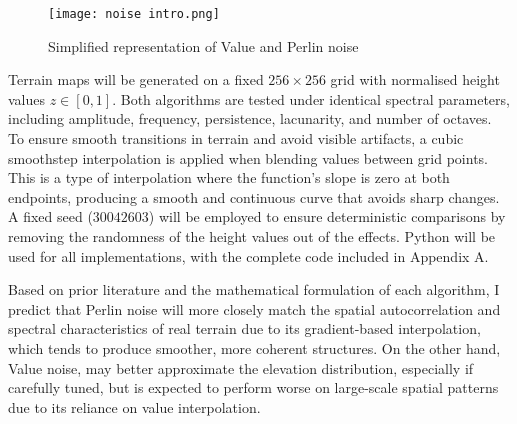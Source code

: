 \begin{figure}[H]
    \centering
    \texttt{[image: noise intro.png]}
    \caption{Simplified representation of Value and Perlin noise}
    \label{fig:noise_intro}
\end{figure}

Terrain maps will be generated on a fixed $256\times256$ grid with normalised height values $z\in[0,1]$. Both algorithms are tested
under identical spectral parameters, including amplitude, frequency, persistence, lacunarity, and number of octaves. To ensure smooth transitions 
in terrain and avoid visible artifacts, a cubic smoothstep interpolation is applied when blending values between grid points. This is a type of 
interpolation where the function's slope is zero at both endpoints, producing a smooth and continuous curve that avoids sharp changes. A fixed seed 
($30042603$) will be employed to ensure deterministic comparisons by removing the randomness of the height values out of the effects. Python will 
be used for all implementations, with the complete code included in Appendix A.

Based on prior literature and the mathematical formulation of each algorithm, I predict that Perlin noise will more closely match the spatial 
autocorrelation and spectral characteristics of real terrain due to its gradient-based interpolation, which tends to produce smoother, more 
coherent structures. On the other hand, Value noise, may better approximate the elevation distribution, especially if carefully tuned, but is 
expected to perform worse on large-scale spatial patterns due to its reliance on value interpolation.